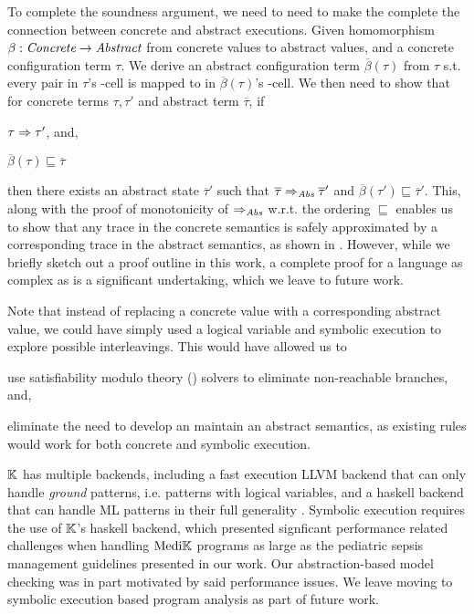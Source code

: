 To complete the soundness argument, we need to need to make the complete the connection
between concrete and abstract executions. Given homomorphism $\beta: \textit{Concrete} \to \textit{Abstract}$
from concrete values to abstract values, and a concrete configuration term
$\tau$. We derive an abstract configuration term $\overline{\beta}\left(\tau\right)$ from $\tau$ s.t.
every  pair in $\tau$'s
-cell is mapped to 
in $\overline{\beta}\left(\tau\right)$'s -cell.
We then need to show that for
concrete terms $\tau, \tau'$ and abstract term $\overline{\tau}$, if
\begin{enumerate*}[label=(\alph*)]
  \item $\tau \Rightarrow \tau'$, and,
  \item $\overline{\beta}\left(\tau\right) \sqsubseteq \overline{\tau}$
\end{enumerate*}
then there exists an abstract state $\overline{\tau}'$ such that
$\overline{\tau} \Rightarrow_{\textit{Abs}} \overline{\tau}'$ and $\overline{\beta}\left(\tau'\right) \sqsubseteq \overline{\tau}'$.
This, along with the proof of monotonicity of $\Rightarrow_{\textit{Abs}}$ w.r.t. the ordering
$\sqsubseteq$ enables us to show that any trace in the concrete semantics is safely approximated
by a corresponding trace in the abstract semantics, as shown in
\cite{SchmidtLISP98}. However, while we briefly sketch out a proof outline
in this work, a complete proof for a language as complex as \MediK{} is a
significant undertaking, which we leave to future work.

Note that instead of replacing a concrete value with a corresponding abstract value,
we could have simply used a logical variable and symbolic execution to explore
possible interleavings. This would have allowed us to
\begin{enumerate*}
  \item use satisfiability modulo theory (\SMT{}) solvers to eliminate
  non-reachable branches, and,
  \item eliminate the need to develop an maintain an abstract semantics, as
  existing rules would work for both concrete and symbolic execution.
\end{enumerate*}

$\mathbb{K}$ has multiple backends, including a fast execution LLVM backend
that can only handle \emph{ground} patterns, i.e. patterns with logical
variables, and a haskell backend that can handle ML patterns in their
full generality \cite{KFrameworkBackendsUrl}. Symbolic execution requires the use of $\mathbb{K}$'s haskell
backend, which presented signficant performance related challenges when
handling $\text{Medi}\mathbb{K}{}{}$ programs as large as the pediatric sepsis management
guidelines presented in our work. Our abstraction-based model checking was in part motivated by
said performance issues. We leave moving to symbolic execution based
program analysis as part of future work.

